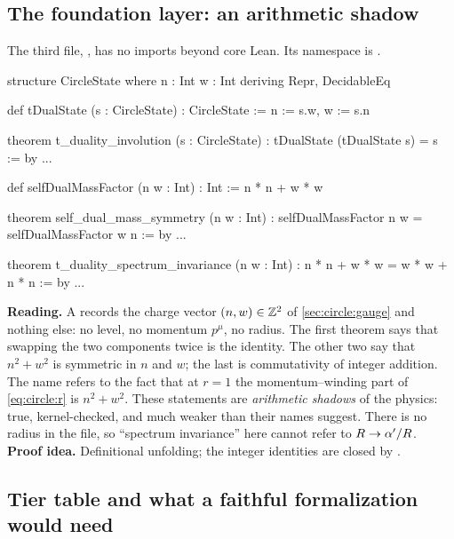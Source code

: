 \subsection{The foundation layer: an arithmetic shadow}

The third file, , has no imports beyond
core Lean. Its namespace is .

\begin{leanbox}
\begin{leancode}
structure CircleState where
  n : Int
  w : Int
  deriving Repr, DecidableEq

def tDualState (s : CircleState) : CircleState :=
  { n := s.w, w := s.n }

theorem t_duality_involution (s : CircleState) :
    tDualState (tDualState s) = s := by ...

def selfDualMassFactor (n w : Int) : Int :=
  n * n + w * w

theorem self_dual_mass_symmetry (n w : Int) :
    selfDualMassFactor n w = selfDualMassFactor w n := by ...

theorem t_duality_spectrum_invariance (n w : Int) :
    n * n + w * w = w * w + n * n := by ...
\end{leancode}
\textbf{Reading.} A  records the charge vector $(n,w)\in\mathbb{Z}^2$ of
\cref{sec:circle:gauge} and nothing else: no level, no momentum $p^\mu$, no radius. The first
theorem says that swapping the two components twice is the identity. The other two say that
$n^2+w^2$ is symmetric in $n$ and $w$; the last is commutativity of integer addition. The name
 refers to the fact that at $r=1$ the momentum--winding part of
\eqref{eq:circle:r} is $n^2+w^2$. These statements are \emph{arithmetic shadows} of the
physics: true, kernel-checked, and much weaker than their names suggest. There is no radius
in the file, so ``spectrum invariance'' here cannot refer to $R\to\alpha'/R$.
\textbf{Proof idea.} Definitional unfolding; the integer identities are closed by
.
\end{leanbox}

\subsection{Tier table and what a faithful formalization would need}

